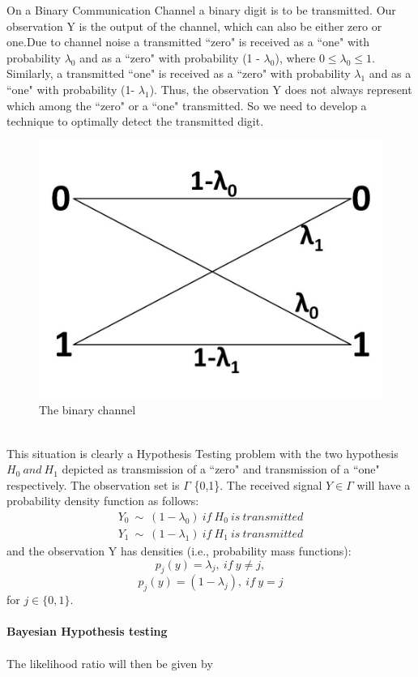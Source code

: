 \documentclass[a4paper,english,12pt]{article}
\begin{document}
\begin{exmp}
On a Binary Communication Channel a binary digit is to be transmitted. Our observation Y is the output of the channel, which can also be either zero or one.Due to channel noise a transmitted ``zero" is received as a ``one" with probability $\lambda_0$ and as a ``zero" with probability (1 - $\lambda_0$), where $0 \leq \lambda_0 \leq 1$. Similarly, a transmitted ``one" is received as a ``zero" with probability $\lambda_1$ and as a ``one" with probability (1- $\lambda_1$). Thus, the observation Y does not always represent which among the ``zero" or a ``one" transmitted. So we need to develop a technique to optimally detect the transmitted digit.
\begin{figure}[h]
\centering
\includegraphics[width=0.6\linewidth]{Figures/bsc1}
\caption{The binary channel}
\label{fig:binary}
\end{figure}\\
This situation is clearly a Hypothesis Testing problem with the two hypothesis $ H_0~ and~ H_1 $ depicted as transmission of a ``zero" and transmission of a ``one" respectively. The observation set is $\Gamma$ \{0,1\}. The received signal $Y \in \Gamma$  will have a probability density function as follows:\\
\begin{eqnarray}
Y_{0}~\sim~\left( 1-\lambda_{0}\right) ~if~H_0~is~transmitted\\
Y_{1}~\sim~\left( 1-\lambda_{1}\right)~if~H_1~is~transmitted \end{eqnarray}
and the observation Y has densities (i.e., probability mass functions):
\begin{equation}
p_{j}\left( y\right) = \lambda_{j} ,~if~ y\neq j,
\end{equation}
\begin{equation}
p_{j}\left( y\right) = \left( 1-\lambda_{j}\right),~if~ y=j
\end{equation}
for $j \in \{0,1\}$.
\\\\
\textbf{Bayesian Hypothesis testing}\\\\
The likelihood ratio will then be given by \\


\end{exmp}
\end{document}
